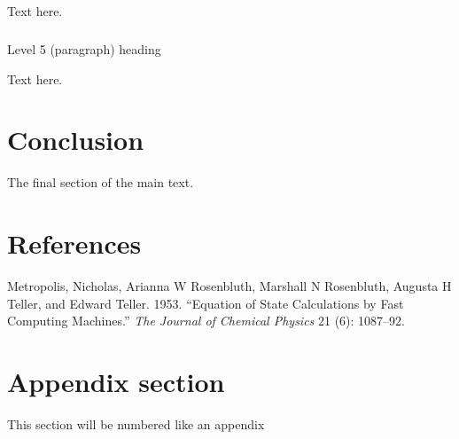 \documentclass[
  11pt,
]{article}
\makeatletter
\let\oldsubparagraph\subparagraph
\renewcommand{\subparagraph}{
    \@ifstar
      \xxxSubParagraphStar
      \xxxSubParagraphNoStar
  }
\newcommand{\xxxSubParagraphStar}[1]{\oldsubparagraph*{#1}\mbox{}}
\newcommand{\xxxSubParagraphNoStar}[1]{\oldsubparagraph{#1}\mbox{}}
\newlength{\cslhangindent}
\newenvironment{CSLReferences}[2] %
 {\begin{list}{}{%
  \setlength{\itemindent}{0pt}
  \setlength{\leftmargin}{0pt}
  \setlength{\parsep}{0pt}
  \ifodd #1
   \setlength{\leftmargin}{\cslhangindent}
   \setlength{\itemindent}{-1\cslhangindent}
  \fi
  \setlength{\itemsep}{#2\baselineskip}}}
 {\end{list}}
\theoremstyle{plain}
\theoremstyle{remark}
\makeatother
\begin{document}
Text here.

\subparagraph{Level 5 (paragraph)
heading}\label{level-5-paragraph-heading}

Text here.

\section{Conclusion}\label{conclusion}

The final section of the main text.

\section*{References}\label{references}

\protect{}\label{refs}
\begin{CSLReferences}{1}{1}
Metropolis, Nicholas, Arianna W Rosenbluth, Marshall N Rosenbluth,
Augusta H Teller, and Edward Teller. 1953. {``Equation of State
Calculations by Fast Computing Machines.''} \emph{The Journal of
Chemical Physics} 21 (6): 1087--92.

\end{CSLReferences}

\appendix

\renewcommand\thefigure{\thesection.\arabic{figure}}

\setcounter{figure}{0}

\section{Appendix section}\label{appendix-section}

This section will be numbered like an appendix
\end{document}
